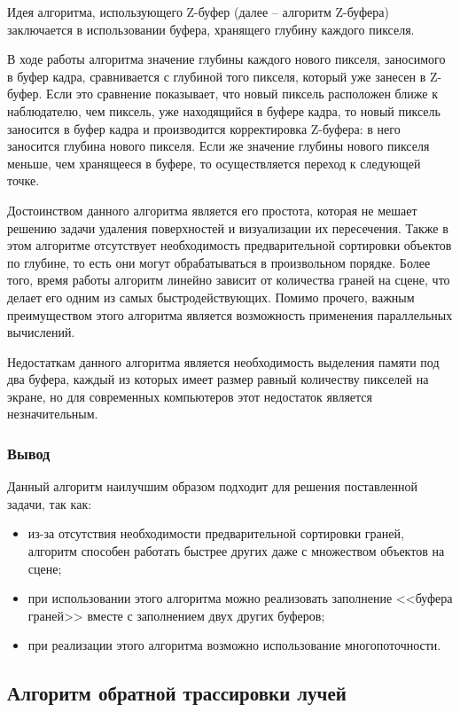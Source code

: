 Идея алгоритма, использующего Z-буфер (далее -- алгоритм Z-буфера) заключается в использовании буфера, хранящего глубину каждого пикселя.

В ходе работы алгоритма значение глубины каждого нового пикселя, заносимого в буфер кадра, сравнивается с глубиной того пикселя, который уже занесен в Z-буфер. Если это сравнение показывает, что новый пиксель расположен ближе к наблюдателю, чем пиксель, уже находящийся в буфере кадра, то новый пиксель заносится в буфер кадра и производится корректировка Z-буфера: в него заносится глубина нового пикселя. Если же значение глубины нового пикселя меньше, чем хранящееся в буфере, то осуществляется переход к следующей точке.

Достоинством данного алгоритма является его простота, которая не мешает решению задачи удаления поверхностей и визуализации их пересечения. Также в этом алгоритме отсутствует необходимость предварительной сортировки объектов по глубине, то есть они могут обрабатываться в произвольном порядке. Более того, время работы алгоритм линейно зависит от количества граней на сцене, что делает его одним из самых быстродействующих. Помимо прочего, важным преимуществом этого алгоритма является возможность применения параллельных вычислений.

Недостаткам данного алгоритма является необходимость выделения памяти под два буфера, каждый из которых имеет размер равный количеству пикселей на экране, но для современных компьютеров этот недостаток является незначительным.

\subsubsection*{Вывод}

Данный алгоритм наилучшим образом подходит для решения поставленной задачи, так как:

\begin{itemize}[label=---]
	\item из-за отсутствия необходимости предварительной сортировки граней, алгоритм способен работать быстрее других даже с множеством объектов на сцене;
	\item при использовании этого алгоритма можно реализовать заполнение <<буфера граней>> вместе с заполнением двух других буферов;
	\item при реализации этого алгоритма возможно использование многопоточности.
\end{itemize}

\subsection{Алгоритм обратной трассировки лучей}

